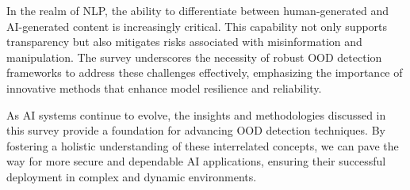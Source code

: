 In the realm of NLP, the ability to differentiate between human-generated and AI-generated content is increasingly critical. This capability not only supports transparency but also mitigates risks associated with misinformation and manipulation. The survey underscores the necessity of robust OOD detection frameworks to address these challenges effectively, emphasizing the importance of innovative methods that enhance model resilience and reliability.

As AI systems continue to evolve, the insights and methodologies discussed in this survey provide a foundation for advancing OOD detection techniques. By fostering a holistic understanding of these interrelated concepts, we can pave the way for more secure and dependable AI applications, ensuring their successful deployment in complex and dynamic environments.
